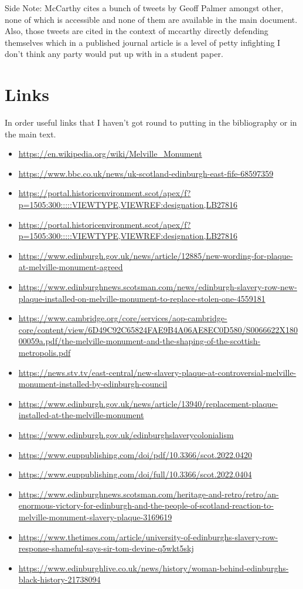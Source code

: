 \documentclass{scrartcl}
\begin{document}
Side Note: McCarthy cites a bunch of tweets by Geoff Palmer amongst other, none of which is accessible and none of them are available in the main document. Also, those tweets are cited in the context of mccarthy directly defending themselves which in a published journal article is a level of petty infighting I don't think any party would put up with in a student paper.

\section{Links}

In order useful links that I haven't got round to putting in the bibliography or in the main text.

\begin{itemize}
    \item \url{https://en.wikipedia.org/wiki/Melville_Monument}
    \item \url{https://www.bbc.co.uk/news/uk-scotland-edinburgh-east-fife-68597359}
    \item \url{https://portal.historicenvironment.scot/apex/f?p=1505:300:::::VIEWTYPE,VIEWREF:designation,LB27816}
    \item \url{https://portal.historicenvironment.scot/apex/f?p=1505:300:::::VIEWTYPE,VIEWREF:designation,LB27816}
    \item \url{https://www.edinburgh.gov.uk/news/article/12885/new-wording-for-plaque-at-melville-monument-agreed}
    \item \url{https://www.edinburghnews.scotsman.com/news/edinburgh-slavery-row-new-plaque-installed-on-melville-monument-to-replace-stolen-one-4559181}
    \item \url{https://www.cambridge.org/core/services/aop-cambridge-core/content/view/6D49C92C65824FAE9B4A06AE8EC0D580/S0066622X18000059a.pdf/the-melville-monument-and-the-shaping-of-the-scottish-metropolis.pdf}
    \item \url{https://news.stv.tv/east-central/new-slavery-plaque-at-controversial-melville-monument-installed-by-edinburgh-council}
    \item \url{https://www.edinburgh.gov.uk/news/article/13940/replacement-plaque-installed-at-the-melville-monument}
    \item \url{https://www.edinburgh.gov.uk/edinburghslaverycolonialism}
    \item \url{https://www.euppublishing.com/doi/pdf/10.3366/scot.2022.0420}
    \item \url{https://www.euppublishing.com/doi/full/10.3366/scot.2022.0404}
    \item \url{https://www.edinburghnews.scotsman.com/heritage-and-retro/retro/an-enormous-victory-for-edinburgh-and-the-people-of-scotland-reaction-to-melville-monument-slavery-plaque-3169619}
    \item \url{https://www.thetimes.com/article/university-of-edinburghs-slavery-row-response-shameful-says-sir-tom-devine-q5wkt5skj}
    \item \url{https://www.edinburghlive.co.uk/news/history/woman-behind-edinburghs-black-history-21738094}
    
\end{itemize}
\end{document}
